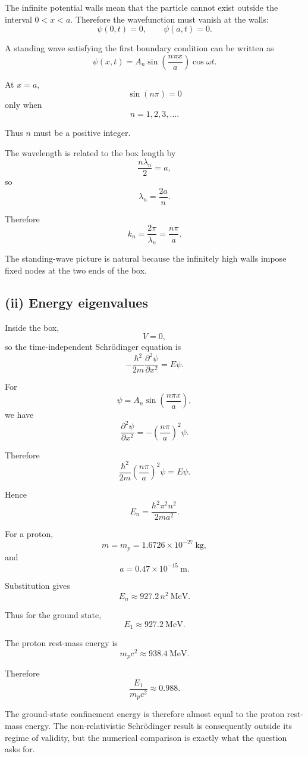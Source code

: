 \documentclass[11pt,a4paper]{article}
\begin{document}
The infinite potential walls mean that the particle cannot exist outside the
interval $0<x<a$. Therefore the wavefunction must vanish at the walls:
\[
\psi(0,t)=0,
\qquad
\psi(a,t)=0.
\]

A standing wave satisfying the first boundary condition can be written as
\[
\psi(x,t)
=
A_n\sin\left(\frac{n\pi x}{a}\right)\cos\omega t.
\]

At $x=a$,
\[
\sin(n\pi)=0
\]
only when
\[
\boxed{n=1,2,3,\ldots}.
\]

Thus $n$ must be a positive integer.

The wavelength is related to the box length by
\[
\frac{n\lambda_n}{2}=a,
\]
so
\[
\lambda_n=\frac{2a}{n}.
\]

Therefore
\[
k_n=\frac{2\pi}{\lambda_n}
=
\frac{n\pi}{a}.
\]

The standing-wave picture is natural because the infinitely high walls impose
fixed nodes at the two ends of the box.

\subsection{(ii) Energy eigenvalues}

Inside the box,
\[
V=0,
\]
so the time-independent Schrödinger equation is
\[
-\frac{\hbar^2}{2m}\frac{\partial^2\psi}{\partial x^2}
=
E\psi.
\]

For
\[
\psi=A_n\sin\left(\frac{n\pi x}{a}\right),
\]
we have
\[
\frac{\partial^2\psi}{\partial x^2}
=
-\left(\frac{n\pi}{a}\right)^2\psi.
\]

Therefore
\[
\frac{\hbar^2}{2m}
\left(\frac{n\pi}{a}\right)^2\psi
=
E\psi.
\]

Hence
\[
\boxed{
E_n=\frac{\hbar^2\pi^2n^2}{2ma^2}
}.
\]

For a proton,
\[
m=m_p=1.6726\times10^{-27}\ \mathrm{kg},
\]
and
\[
a=0.47\times10^{-15}\ \mathrm m.
\]

Substitution gives
\[
E_n\approx927.2\,n^2\ \mathrm{MeV}.
\]

Thus for the ground state,
\[
\boxed{E_1\approx927.2\ \mathrm{MeV}}.
\]

The proton rest-mass energy is
\[
m_pc^2\approx938.4\ \mathrm{MeV}.
\]

Therefore
\[
\boxed{\frac{E_1}{m_pc^2}\approx0.988}.
\]

The ground-state confinement energy is therefore almost equal to the proton
rest-mass energy. The non-relativistic Schrödinger result is consequently outside
its regime of validity, but the numerical comparison is exactly what the
question asks for.
\end{document}
